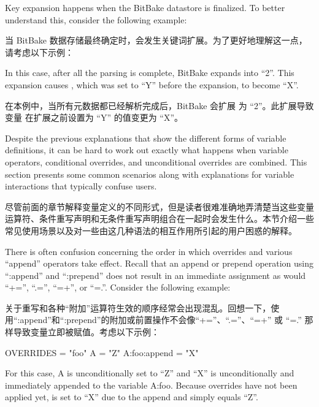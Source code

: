 
Key expansion happens when the BitBake datastore is finalized. To better understand this, consider the following example:

当 BitBake 数据存储最终确定时，会发生关键词扩展。为了更好地理解这一点，请考虑以下示例：


In this case, after all the parsing is complete, BitBake expands  into ``2''. This expansion causes , which was set to ``Y'' before the expansion, to become ``X''.

在本例中，当所有元数据都已经解析完成后，BitBake 会扩展  为 ``2''。此扩展导致变量  在扩展之前设置为 ``Y'' 的值变更为 ``X''。


Despite the previous explanations that show the different forms of variable definitions, it can be hard to work out exactly what happens when variable operators, conditional overrides, and unconditional overrides are combined. This section presents some common scenarios along with explanations for variable interactions that typically confuse users.

尽管前面的章节解释变量定义的不同形式，但是读者很难准确地弄清楚当这些变量运算符、条件重写声明和无条件重写声明组合在一起时会发生什么。本节介绍一些常见使用场景以及对一些由这几种语法的相互作用所引起的用户困惑的解释。

There is often confusion concerning the order in which overrides and various ``append'' operators take effect. Recall that an append or prepend operation using ``:append'' and ``:prepend'' does not result in an immediate assignment as would ``+='', ``.='', ``=+'', or ``=.''. Consider the following example:

关于重写和各种``附加''运算符生效的顺序经常会出现混乱。回想一下，使用``:append''和``:prepend''的附加或前置操作不会像``+=''、``.=''、``=+'' 或 ``=.'' 那样导致变量立即被赋值。考虑以下示例：

\begin{pyglist}
OVERRIDES = "foo"
A = "Z"
A:foo:append = "X"
\end{pyglist}

For this case, A is unconditionally set to ``Z'' and ``X'' is unconditionally and immediately appended to the variable A:foo. Because overrides have not been applied yet,  is set to ``X'' due to the append and  simply equals ``Z''.

